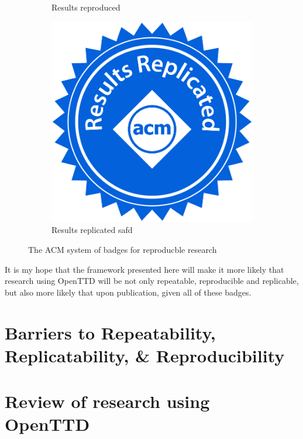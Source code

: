 \documentclass[logo,msc,dsti]{infthesis}    %
\begin{document}
\begin{figure}
\begin{subfigure}[t]{0.3\columnwidth}
         \caption{Results reproduced}
         \label{fig:five over x}
     \end{subfigure}
     \begin{subfigure}[t]{0.3\columnwidth}
         \centering
         \includegraphics[width=\textwidth]{assets/results_replicated.jpg}
         \caption{Results replicated  safd }
         \label{fig:five over x}
     \end{subfigure}
        \caption{The ACM system of badges for reproducble research}
        \label{fig:acm_badges}
\end{figure}

It is my hope that the framework presented here will make it more likely that research using OpenTTD will be not only repeatable, reproducible and replicable, but also more likely that upon publication, given all of these badges. 

\section{Barriers to Repeatability, Replicatability, \& Reproducibility}

\section{Review of research using OpenTTD}
\end{document}
